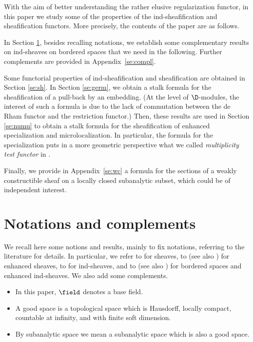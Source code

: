 With the aim of better understanding the rather elusive regularization functor,
in this paper we study some of the properties of the ind-sheafification and sheafification functors. More precisely, the contents of the paper are as follows.

In Section \ref{se:not}, besides recalling notations, we establish some complementary results on ind-sheaves on bordered spaces that we need in the following.
Further complements are provided in Appendix~\ref{se:compl}.

Some functorial properties of ind-sheafification and sheafification are obtained in Section \ref{se:sh}.
In Section \ref{se:germ}, we obtain a stalk formula for the sheafification of a pull-back by an embedding.
(At the level of $\D$-modules, the interest of such a formula is due to the lack of commutation between the de Rham functor and the restriction functor.)
Then, these results are used in Section \ref{se:numu} to obtain a stalk formula for the sheafification of enhanced specialization and microlocalization.
In particular, the formula for the specialization puts in a more geometric perspective what we called \emph{multiplicity test functor} in \cite[\S6.3]{DK18}.

Finally, we provide in Appendix~\ref{se:wc} a formula for the sections of a weakly constructible sheaf on a locally closed subanalytic subset, which could be of independent interest.

\section{Notations and complements}\label{se:not}
We recall here some notions and results, mainly to fix notations, referring to the literature for details. In particular, we refer to \cite{KS90} for sheaves, to \cite{Tam08} (see also \cite{GS14,DK19}) for enhanced sheaves, to \cite{KS01} for ind-sheaves, and to \cite{DK16} (see also \cite{KS16,Kas16,DK19}) for bordered spaces and enhanced ind-sheaves. We also add some complements.

\begin{itemize}
\item
In this paper, $\field$ denotes a base field.

\item
A good space is a topological space which is Hausdorff, locally compact, countable at infinity, and with finite soft dimension.

\item
By subanalytic space we mean a subanalytic space which is also a good space.
\end{itemize}

